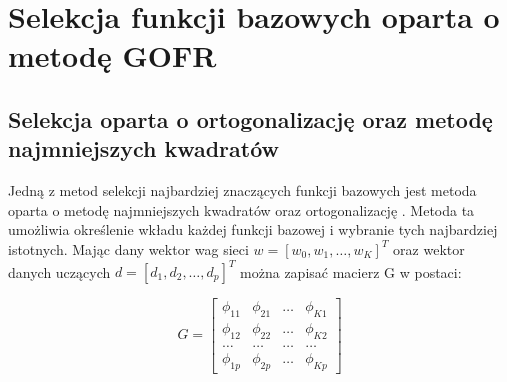 \newpage
\section{Selekcja funkcji bazowych oparta o metodę GOFR}

\subsection{Selekcja oparta o ortogonalizację oraz metodę najmniejszych kwadratów}
Jedną z metod selekcji najbardziej znaczących funkcji bazowych jest metoda oparta o metodę najmniejszych kwadratów oraz ortogonalizację \cite{Chen}. Metoda ta umożliwia określenie wkładu każdej funkcji bazowej i wybranie tych najbardziej istotnych. Mając dany wektor wag sieci $w = [w_0, w_1, \hdots, w_K]^T$ oraz wektor danych uczących $d = [d_1, d_2, \hdots, d_p]^T$ można zapisać macierz G w postaci:

\begin{equation}
G = \begin{bmatrix}
\phi_{11} & \phi_{21} & \hdots & \phi_{K1} \\
\phi_{12} & \phi_{22} & \hdots & \phi_{K2} \\
\hdots    & \hdots    & \hdots & \hdots    \\
\phi_{1p} & \phi_{2p} & \hdots & \phi_{Kp}
\end{bmatrix}
\end{equation}

